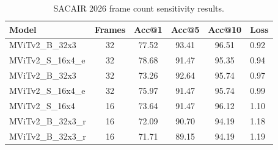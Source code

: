 \begin{table}
\caption{SACAIR 2026 frame count sensitivity results.}
\label{tab:res_sacair_2026}
\begin{tabular}{lcccc}
\toprule
Model & Frames & Acc@1 & Acc@5 & Acc@10 & Loss \\
\midrule
MViTv2_B_32x3 & 32 & 77.52 & 93.41 & 96.51 & 0.92 \\
MViTv2_S_16x4_e & 32 & 78.68 & 91.47 & 95.35 & 0.94 \\
MViTv2_B_32x3 & 32 & 73.26 & 92.64 & 95.74 & 0.97 \\
MViTv2_S_16x4_e & 32 & 75.97 & 91.47 & 95.74 & 0.99 \\
MViTv2_S_16x4 & 16 & 73.64 & 91.47 & 96.12 & 1.10 \\
MViTv2_B_32x3_r & 16 & 72.09 & 90.70 & 94.19 & 1.18 \\
MViTv2_B_32x3_r & 16 & 71.71 & 89.15 & 94.19 & 1.19 \\
\bottomrule
\end{tabular}
\end{table}
